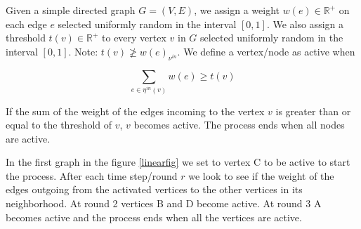 Given a simple directed graph $G=(V,E)$, we assign a weight $w(e) \in \mathbb{R}^{+}$ on each edge $e$ selected uniformly random in the interval $[0,1]$. We also assign a threshold $t(v) \in \mathbb{R}^{+}$ to every vertex $v$ in $G$ selected uniformly random in the interval $[0,1]$. Note: $t(v) \not\geq w(e)_{\nu^{in}}$.
We define a vertex/node as active when

		$$\sum_{e \in \eta^{in}(v)} w(e)\geq t(v)$$

If the sum of the weight of the edges incoming to the vertex $v$ is greater than or equal to the threshold of $v$, $v$ becomes active. The process ends when all nodes are active.

In the first graph in the figure \ref{linearfig} we set to vertex C to be active to start the process. After each time step/round $r$ we look to see if the weight of the edges outgoing from the activated vertices to the other vertices in its neighborhood. At round 2 vertices B and D become active. At round 3 A becomes active and the process ends when all the vertices are active. \cite{Kempe}

